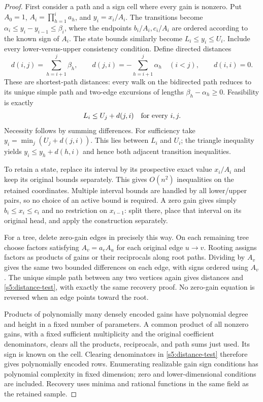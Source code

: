 \begin{proof}
First consider a path and a sign cell where every gain is nonzero. Put
$A_0=1$, $A_i=\prod_{h=1}^i a_h$, and $y_i=x_i/A_i$. The transitions
become $\alpha_i\le y_i-y_{i-1}\le\beta_i$, where the endpoints
$b_i/A_i,c_i/A_i$ are ordered according to the known sign of $A_i$.
The state bounds similarly become $L_i\le y_i\le U_i$. Include every
lower-versus-upper consistency condition. Define directed distances
\[
 d(i,j)=\sum_{h=i+1}^j\beta_h,\qquad
 d(j,i)=-\sum_{h=i+1}^j\alpha_h\quad(i<j),\qquad d(i,i)=0.
\]
These are shortest-path distances: every walk on the bidirected path
reduces to its unique simple path and two-edge excursions of lengths
$\beta_h-\alpha_h\ge0$. Feasibility is exactly
\begin{equation}
 L_i\le U_j+d(j,i)\quad\hbox{for every }i,j.
 \label{s5:distance-test}
\end{equation}
Necessity follows by summing differences. For sufficiency take
$y_i=\min_j(U_j+d(j,i))$. This lies between $L_i$ and $U_i$; the
triangle inequality yields $y_i\le y_h+d(h,i)$ and hence both
adjacent transition inequalities.

To retain a state, replace its interval by its prospective exact value
$x_i/A_i$ and keep its original bounds separately. This gives
$O(n^2)$ inequalities on the retained coordinates. Multiple interval
bounds are handled by all lower/upper pairs, so no choice of an active
bound is required. A zero gain gives simply $b_i\le x_i\le c_i$ and
no restriction on $x_{i-1}$: split there, place that interval on its
original head, and apply the construction separately.

For a tree, delete zero-gain edges in precisely this way. On each
remaining tree choose factors satisfying $A_v=a_eA_u$ for each original
edge $u\to v$. Rooting assigns factors as products of gains or their
reciprocals along root paths. Dividing by $A_v$ gives the same two
bounded differences on each edge, with signs ordered using $A_v$.
The unique simple path between any two vertices again gives distances
and \eqref{s5:distance-test}, with exactly the same recovery proof.
No zero-gain equation is reversed when an edge points toward the root.

Products of polynomially many densely encoded gains have polynomial
degree and height in a fixed number of parameters. A common product of
all nonzero gains, with a fixed sufficient multiplicity and the original
coefficient denominators, clears all the products, reciprocals, and
path sums just used. Its sign is known on the cell. Clearing denominators
in \eqref{s5:distance-test} therefore gives polynomially encoded rows.
Enumerating realizable gain sign conditions has polynomial complexity
in fixed dimension; zero and lower-dimensional conditions are included.
Recovery uses minima and rational functions in the same field as the
retained sample.


\end{proof}
